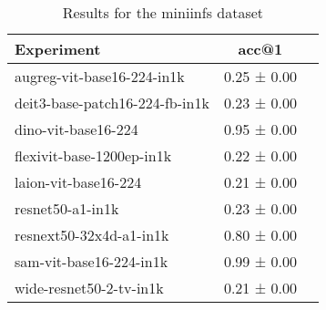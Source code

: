\begin{table}[htbp]
\caption{Results for the miniinfs dataset}
\begin{tabular}{|l|c|c|}\hline
Experiment & acc@1\\
\hline
augreg-vit-base16-224-in1k & 0.25 ± 0.00\\
\hline
deit3-base-patch16-224-fb-in1k & 0.23 ± 0.00\\
\hline
dino-vit-base16-224 & 0.95 ± 0.00\\
\hline
flexivit-base-1200ep-in1k & 0.22 ± 0.00\\
\hline
laion-vit-base16-224 & 0.21 ± 0.00\\
\hline
resnet50-a1-in1k & 0.23 ± 0.00\\
\hline
resnext50-32x4d-a1-in1k & 0.80 ± 0.00\\
\hline
sam-vit-base16-224-in1k & 0.99 ± 0.00\\
\hline
wide-resnet50-2-tv-in1k & 0.21 ± 0.00\\
\hline
\end{tabular}
\end{table}

